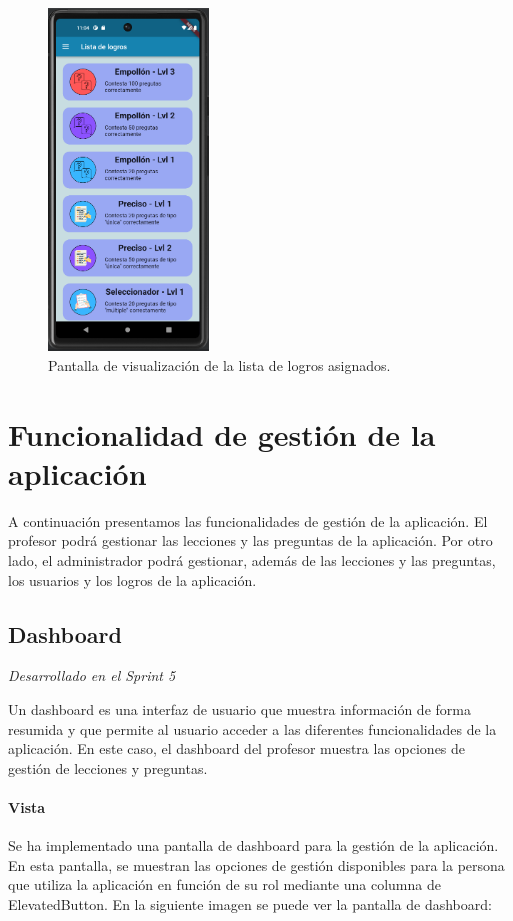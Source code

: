 \begin{figure}[H]
  \centering
  \includegraphics[width=0.38\textwidth]{imagenes/c7/listalogrosperfil.png}
  \caption{Pantalla de visualización de la lista de logros asignados.} 
  \label{fig:ver_logros_perfil}
\end{figure}

\section{Funcionalidad de gestión de la aplicación}
A continuación presentamos las funcionalidades de gestión de la aplicación. 
El profesor podrá gestionar las lecciones y las preguntas de la aplicación. 
Por otro lado, el administrador podrá gestionar, además de las lecciones y las preguntas, los usuarios y los logros de la aplicación.

\subsection{Dashboard}

\textit{Desarrollado en el Sprint 5}
\label{sec:dashboard}

Un dashboard es una interfaz de usuario que muestra información de forma resumida y que permite al usuario acceder a las diferentes funcionalidades de la aplicación. En este caso, el dashboard del profesor muestra las opciones de gestión de lecciones y preguntas.

\paragraph*{Vista}
Se ha implementado una pantalla de dashboard para la gestión de la aplicación. En esta pantalla, se muestran las opciones de gestión disponibles para la persona que utiliza la aplicación en función de su rol mediante una columna de ElevatedButton. En la siguiente imagen se puede ver la pantalla de dashboard:

